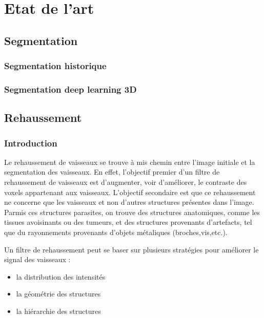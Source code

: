 %
\chapter{Etat de l'art}


\section{Segmentation}
\label{sec:EA:segmentation}

\subsection{Segmentation historique}
\label{sec:EA:segmentation_historique}

\subsection{Segmentation deep learning 3D}
\label{sec:EA:segmentation_deep3D}

\section{Rehaussement}
\label{sec:EA:rehaussement}
\subsection{Introduction}
\label{sec:EA:rehaussement:introduction}
Le rehaussement de vaisseaux se trouve à mis chemin entre l'image initiale et la segmentation des vaisseaux. En effet, l'objectif premier d'un filtre de rehaussement de vaisseaux est d'augmenter, voir d'améliorer, le contraste des voxels appartenant aux vaisseaux. L'objectif secondaire est que ce rehaussement ne concerne que les vaisseaux et non d'autres structures présentes dans l'image. Parmis ces structures parasites, on trouve des structures anatomiques, comme les tissues avoisinants ou des tumeurs, et des structures provenants d'artefacts, tel que du rayonnements provenants d'objets métaliques (broches,vis,etc.).

Un filtre de rehaussement peut se baser sur plusieurs stratégies pour améliorer le signal des vaisseaux :

\begin{itemize}
\item la distribution des intensités
\item la géométrie des structures
\item la hiérarchie des structures
\end{itemize}

